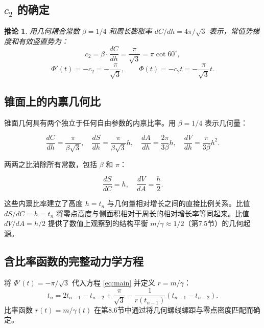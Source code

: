 \documentclass[12pt,a4paper]{article}
\newtheorem{corollary}[theorem]{推论}
\begin{document}
\subsection{$c_2$ 的确定}

\begin{corollary}
用几何耦合常数 $\beta = 1/4$ 和周长膨胀率 $dC/dh = 4\pi/\sqrt{3}$ 表示，常值势梯度和有效竖直势为：
\begin{equation}
c_2 = \beta \cdot \frac{dC}{dh} = \frac{\pi}{\sqrt{3}} = \pi\cot 60^\circ,
\end{equation}
\begin{equation}
\Phi'(t) = -c_2 = -\frac{\pi}{\sqrt{3}}, \qquad \Phi(t) = -c_2 t = -\frac{\pi}{\sqrt{3}}t.
\end{equation}
\end{corollary}

\subsection{锥面上的内禀几何比}

锥面几何具有两个独立于任何自由参数的内禀比率。用 $\beta = 1/4$ 表示几何量：

\begin{equation}
\frac{dC}{dh} = \frac{\pi}{\beta\sqrt{3}}, \quad \frac{dS}{dh} = \frac{\pi}{\beta\sqrt{3}}h, \quad \frac{dA}{dh} = \frac{2\pi}{3\beta}h, \quad \frac{dV}{dh} = \frac{\pi}{3\beta}h^2.
\end{equation}

两两之比消除所有常数，包括 $\beta$ 和 $\pi$：

\begin{equation}
\boxed{\frac{dS}{dC} = h, \quad \frac{dV}{dA} = \frac{h}{2}}.
\end{equation}

这些内禀比率建立了高度 $h = t_n$ 与几何量相对增长之间的直接比例关系。比值 $dS/dC = h = t_n$ 将零点高度与侧面积相对于周长的相对增长率等同起来。比值 $dV/dA = h/2$ 提供了数值上观察到的结构平衡 $m/\gamma \approx 1/2$（第7.5节）的几何起源。

\subsection{含比率函数的完整动力学方程}

将 $\Phi'(t) = -\pi/\sqrt{3}$ 代入方程 \eqref{eq:main} 并定义 $r = m/\gamma$：
\begin{equation}
t_n = 2t_{n-1} - t_{n-2} + \frac{\pi}{\sqrt{3}} - \frac{1}{r(t_{n-1})}(t_{n-1} - t_{n-2}).
\end{equation}
比率函数 $r(t) = m/\gamma(t)$ 在第8.6节中通过将几何螺线螺距与零点密度匹配而确定。
\end{document}
